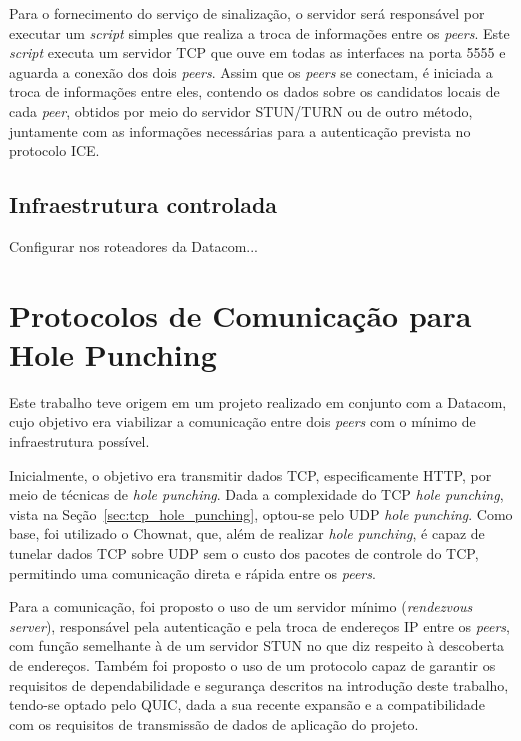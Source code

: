 Para o fornecimento do serviço de sinalização, o servidor será responsável por executar um \textit{script} simples que realiza a troca de informações entre os \textit{peers}. Este \textit{script} executa um servidor TCP que ouve em todas as interfaces na porta 5555 e aguarda a conexão dos dois \textit{peers}. Assim que os \textit{peers} se conectam, é iniciada a troca de informações entre eles, contendo os dados sobre os candidatos locais de cada \textit{peer}, obtidos por meio do servidor STUN/TURN ou de outro método, juntamente com as informações necessárias para a autenticação prevista no protocolo ICE.

\subsection{Infraestrutura controlada}

Configurar nos roteadores da Datacom...


\section{Protocolos de Comunicação para Hole Punching}
\label{sec:hole_punching_protocols}

Este trabalho teve origem em um projeto realizado em conjunto com a Datacom, cujo objetivo era viabilizar a comunicação entre dois \textit{peers} com o mínimo de infraestrutura possível. %

Inicialmente, o objetivo era transmitir dados TCP, especificamente HTTP, por meio de técnicas de \textit{hole punching}. Dada a complexidade do TCP \textit{hole punching}, vista na Seção~\ref{sec:tcp_hole_punching}, optou-se pelo UDP \textit{hole punching}. Como base, foi utilizado o Chownat, que, além de realizar \textit{hole punching}, é capaz de tunelar dados TCP sobre UDP sem o custo dos pacotes de controle do TCP, permitindo uma comunicação direta e rápida entre os \textit{peers}.

Para a comunicação, foi proposto o uso de um servidor mínimo (\textit{rendezvous server}), responsável pela autenticação e pela troca de endereços IP entre os \textit{peers}, com função semelhante à de um servidor STUN no que diz respeito à descoberta de endereços. Também foi proposto o uso de um protocolo capaz de garantir os requisitos de dependabilidade e segurança descritos na introdução deste trabalho, tendo-se optado pelo QUIC, dada a sua recente expansão e a compatibilidade com os requisitos de transmissão de dados de aplicação do projeto.

